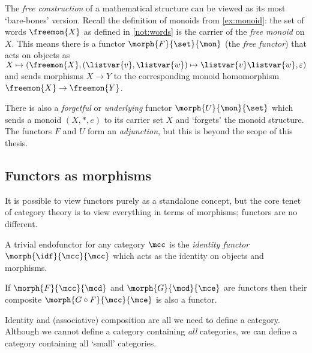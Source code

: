 \begin{example}\label{ex:free-monoid}
    The \emph{free construction} of a mathematical structure can be viewed as
    its most `bare-bones' version.
    Recall the definition of monoids from \cref{ex:monoid}: the set of words
    \(\freemon{X}\) as defined in \cref{not:words} is the carrier of the
    \emph{free monoid} on \(X\).
    This means there is a functor \(\morph{F}{\set}{\mon}\) (the
    \emph{free functor}) that acts on objects as \(
    X \mapsto (
    \freemon{X},
    (\listvar{v}, \listvar{w}) \mapsto \listvar{v}\listvar{w},
    \varepsilon
    )\) and sends morphisms \(X \to Y\) to the corresponding monoid homomorphism
    \(\freemon{X} \to \freemon{Y}\).

    There is also a \emph{forgetful} or \emph{underlying} functor
    \(\morph{U}{\mon}{\set}\) which sends a monoid \((X, *, e)\) to its carrier
    set \(X\) and `forgets' the monoid structure.
    The functors \(F\) and \(U\) form an \emph{adjunction}, but this
    is beyond the scope of this thesis.
\end{example}

\subsection{Functors as morphisms}

It is possible to view functors purely as a standalone concept, but the
core tenet of category theory is to view everything in terms of morphisms;
functors are no different.

\begin{example}
    A trivial endofunctor for any category \(\mcc\) is the
    \emph{identity functor} \(\morph{\idf}{\mcc}{\mcc}\) which acts as the
    identity on objects and morphisms.
\end{example}

\begin{example}
    If \(\morph{F}{\mcc}{\mcd}\) and \(\morph{G}{\mcd}{\mce}\) are functors
    then their composite \(\morph{G \circ F}{\mcc}{\mce}\) is also a functor.
\end{example}

Identity and (associative) composition are all we need to define a category.
Although we cannot define a category containing \emph{all} categories, we can
define a category containing all `small' categories.

